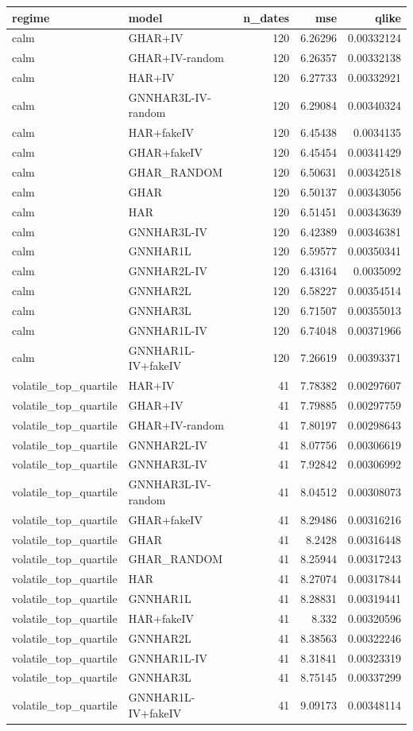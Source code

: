 \begin{tabular}{llrrr}
\toprule
regime & model & n_dates & mse & qlike \\
\midrule
calm & GHAR+IV & 120 & 6.26296 & 0.00332124 \\
calm & GHAR+IV-random & 120 & 6.26357 & 0.00332138 \\
calm & HAR+IV & 120 & 6.27733 & 0.00332921 \\
calm & GNNHAR3L-IV-random & 120 & 6.29084 & 0.00340324 \\
calm & HAR+fakeIV & 120 & 6.45438 & 0.0034135 \\
calm & GHAR+fakeIV & 120 & 6.45454 & 0.00341429 \\
calm & GHAR_RANDOM & 120 & 6.50631 & 0.00342518 \\
calm & GHAR & 120 & 6.50137 & 0.00343056 \\
calm & HAR & 120 & 6.51451 & 0.00343639 \\
calm & GNNHAR3L-IV & 120 & 6.42389 & 0.00346381 \\
calm & GNNHAR1L & 120 & 6.59577 & 0.00350341 \\
calm & GNNHAR2L-IV & 120 & 6.43164 & 0.0035092 \\
calm & GNNHAR2L & 120 & 6.58227 & 0.00354514 \\
calm & GNNHAR3L & 120 & 6.71507 & 0.00355013 \\
calm & GNNHAR1L-IV & 120 & 6.74048 & 0.00371966 \\
calm & GNNHAR1L-IV+fakeIV & 120 & 7.26619 & 0.00393371 \\
volatile_top_quartile & HAR+IV & 41 & 7.78382 & 0.00297607 \\
volatile_top_quartile & GHAR+IV & 41 & 7.79885 & 0.00297759 \\
volatile_top_quartile & GHAR+IV-random & 41 & 7.80197 & 0.00298643 \\
volatile_top_quartile & GNNHAR2L-IV & 41 & 8.07756 & 0.00306619 \\
volatile_top_quartile & GNNHAR3L-IV & 41 & 7.92842 & 0.00306992 \\
volatile_top_quartile & GNNHAR3L-IV-random & 41 & 8.04512 & 0.00308073 \\
volatile_top_quartile & GHAR+fakeIV & 41 & 8.29486 & 0.00316216 \\
volatile_top_quartile & GHAR & 41 & 8.2428 & 0.00316448 \\
volatile_top_quartile & GHAR_RANDOM & 41 & 8.25944 & 0.00317243 \\
volatile_top_quartile & HAR & 41 & 8.27074 & 0.00317844 \\
volatile_top_quartile & GNNHAR1L & 41 & 8.28831 & 0.00319441 \\
volatile_top_quartile & HAR+fakeIV & 41 & 8.332 & 0.00320596 \\
volatile_top_quartile & GNNHAR2L & 41 & 8.38563 & 0.00322246 \\
volatile_top_quartile & GNNHAR1L-IV & 41 & 8.31841 & 0.00323319 \\
volatile_top_quartile & GNNHAR3L & 41 & 8.75145 & 0.00337299 \\
volatile_top_quartile & GNNHAR1L-IV+fakeIV & 41 & 9.09173 & 0.00348114 \\
\bottomrule
\end{tabular}
